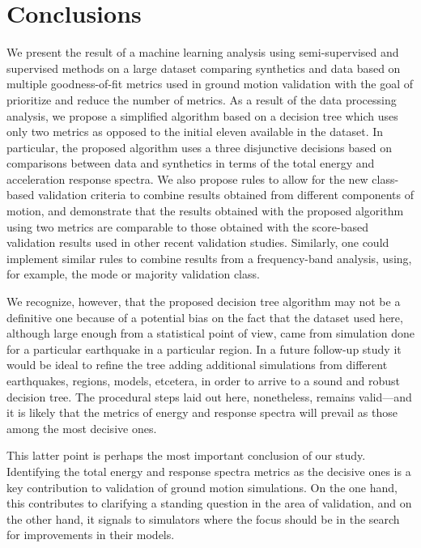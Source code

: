 
\section{Conclusions}

We present the result of a machine learning analysis using semi-supervised and supervised methods on a large dataset comparing synthetics and data based on multiple goodness-of-fit metrics used in ground motion validation with the goal of prioritize and reduce the number of metrics. As a result of the data processing analysis, we propose a simplified algorithm based on a decision tree which uses only two metrics as opposed to the initial eleven available in the dataset. In particular, the proposed algorithm uses a three disjunctive decisions based on comparisons between data and synthetics in terms of the total energy and acceleration response spectra. We also propose rules to allow for the new class-based validation criteria to combine results obtained from different components of motion, and demonstrate that the results obtained with the proposed algorithm using two metrics are comparable to those obtained with the score-based validation results used in other recent validation studies. Similarly, one could implement similar rules to combine results from a frequency-band analysis, using, for example, the mode or majority validation class. 

We recognize, however, that the proposed decision tree algorithm may not be a definitive one because of a potential bias on the fact that the dataset used here, although large enough from a statistical point of view, came from simulation done for a particular earthquake in a particular region. In a future follow-up study it would be ideal to refine the tree adding additional simulations from different earthquakes, regions, models, etcetera, in order to arrive to a sound and robust decision tree. The procedural steps laid out here, nonetheless, remains valid---and it is likely that the metrics of energy and response spectra will prevail as those among the most decisive ones.

This latter point is perhaps the most important conclusion of our study. Identifying the total energy and response spectra metrics as the decisive ones is a key contribution to validation of ground motion simulations. On the one hand, this contributes to clarifying a standing question in the area of validation, and on the other hand, it signals to simulators where the focus should be in the search for improvements in their models.

